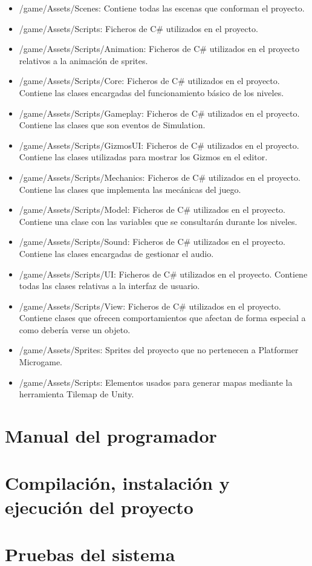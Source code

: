 \begin{itemize}
\item
/game/Assets/Scenes: Contiene todas las escenas que conforman el proyecto.
\item
/game/Assets/Scripts: Ficheros de C\# utilizados en el proyecto.
\item
/game/Assets/Scripts/Animation: Ficheros de C\# utilizados en el proyecto relativos a la animación de sprites.
\item
/game/Assets/Scripts/Core: Ficheros de C\# utilizados en el proyecto. Contiene las clases encargadas del funcionamiento básico de los niveles.
\item
/game/Assets/Scripts/Gameplay: Ficheros de C\# utilizados en el proyecto. Contiene las clases que son eventos de Simulation.
\item
/game/Assets/Scripts/GizmosUI: Ficheros de C\# utilizados en el proyecto. Contiene las clases utilizadas para mostrar los Gizmos en el editor.
\item
/game/Assets/Scripts/Mechanics: Ficheros de C\# utilizados en el proyecto. Contiene las clases que implementa las mecánicas del juego.
\item
/game/Assets/Scripts/Model: Ficheros de C\# utilizados en el proyecto. Contiene una clase con las variables que se consultarán durante los niveles.
\item
/game/Assets/Scripts/Sound: Ficheros de C\# utilizados en el proyecto. Contiene las clases encargadas de gestionar el audio.
\item
/game/Assets/Scripts/UI: Ficheros de C\# utilizados en el proyecto. Contiene todas las clases relativas a la interfaz de usuario.
\item
/game/Assets/Scripts/View: Ficheros de C\# utilizados en el proyecto. Contiene clases que ofrecen comportamientos que afectan de forma especial a como debería verse un objeto.
\item
/game/Assets/Sprites: Sprites del proyecto que no pertenecen a Platformer Microgame.
\item
/game/Assets/Scripts: Elementos usados para generar mapas mediante la herramienta Tilemap de Unity.
\end{itemize}

\section{Manual del programador}

\section{Compilación, instalación y ejecución del proyecto}

\section{Pruebas del sistema}
